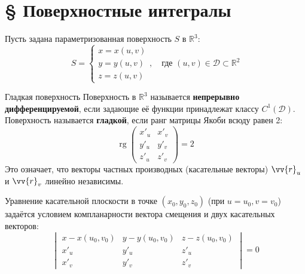 \documentclass[12pt,a4paper]{article}
\begin{document}
\section{§ Поверхностные интегралы}

Пусть задана параметризованная поверхность $S$ в $\mathbb{R}^3$:
$$ S = \left\{ \begin{matrix} x = x(u,v) \\ y = y(u,v) \\ z = z(u,v) \end{matrix} \right., \quad \text{где } (u,v) \in \mathscr{D} \subset \mathbb{R}^2 $$

\begin{Definition}{Гладкая поверхность}{}
Поверхность в $\mathbb{R}^3$ называется \textbf{непрерывно дифференцируемой}, если задающие её функции принадлежат классу $C^1(\mathscr{D})$. \\
Поверхность называется \textbf{гладкой}, если ранг матрицы Якоби всюду равен 2:
$$ \operatorname{rg} \begin{pmatrix} x'_u & x'_v \\ y'_u & y'_v \\ z'_u & z'_v \end{pmatrix} = 2 $$
Это означает, что векторы частных производных (касательные векторы) $\vv{r}_u$ и $\vv{r}_v$ линейно независимы.
\end{Definition}

Уравнение касательной плоскости в точке $(x_0, y_0, z_0)$ (при $u=u_0, v=v_0$) задаётся условием компланарности вектора смещения и двух касательных векторов:
$$ \begin{vmatrix} x - x(u_0, v_0) & y - y(u_0, v_0) & z - z(u_0, v_0) \\ x'_u & y'_u & z'_u \\ x'_v & y'_v & z'_v \end{vmatrix} = 0 $$
\end{document}
